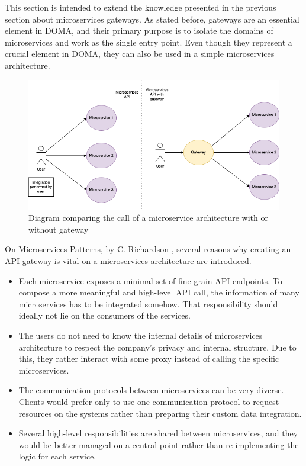 \documentclass[english, 12pt, a4paper, sci, utf8, a-1b, online]{aaltothesis}
\begin{document}
This section is intended to extend the knowledge presented in the previous section about microservices gateways. As stated before, gateways are an essential element in DOMA, and their primary purpose is to isolate the domains of microservices and work as the single entry point. Even though they represent a crucial element in DOMA, they can also be used in a simple microservices architecture.\\

\begin{figure}[h!]
    \centering
    \includegraphics[scale=0.3]{src/thesis/img/literature-review/gateway.png}
    \caption{Diagram comparing the call of a microservice architecture with or without gateway}
\end{figure}

On Microservices Patterns, by C. Richardson \cite{richardson2018microservices}, several reasons why creating an API gateway is vital on a microservices architecture are introduced.

\begin{itemize}
    \item Each microservice exposes a minimal set of fine-grain API endpoints. To compose a more meaningful and high-level API call, the information of many microservices has to be integrated somehow. That responsibility should ideally not lie on the consumers of the services.
    \item The users do not need to know the internal details of microservices architecture to respect the company's privacy and internal structure. Due to this, they rather interact with some proxy instead of calling the specific microservices.
    \item The communication protocols between microservices can be very diverse. Clients would prefer only to use one communication protocol to request resources on the systems rather than preparing their custom data integration.
    \item Several high-level responsibilities are shared between microservices, and they would be better managed on a central point rather than re-implementing the logic for each service.
\end{itemize}
\end{document}

